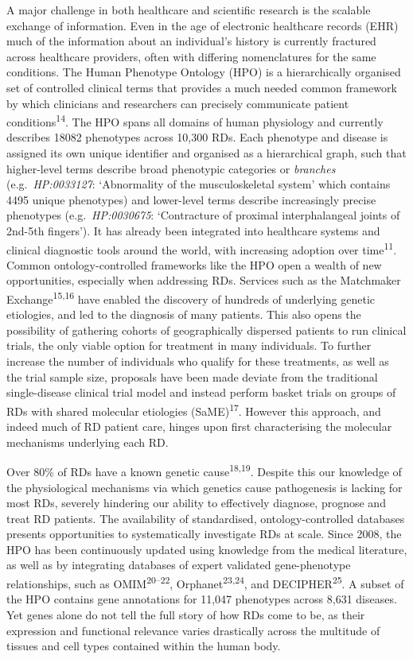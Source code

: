 \documentclass[
]{agujournal2019}
\begin{document}
A major challenge in both healthcare and scientific research is the
scalable exchange of information. Even in the age of electronic
healthcare records (EHR) much of the information about an individual's
history is currently fractured across healthcare providers, often with
differing nomenclatures for the same conditions. The Human Phenotype
Ontology (HPO) is a hierarchically organised set of controlled clinical
terms that provides a much needed common framework by which clinicians
and researchers can precisely communicate patient
conditions\textsuperscript{14}. The HPO spans all domains of human
physiology and currently describes 18082 phenotypes across 10,300 RDs.
Each phenotype and disease is assigned its own unique identifier and
organised as a hierarchical graph, such that higher-level terms describe
broad phenotypic categories or \emph{branches} (e.g.~\emph{HP:0033127}:
`Abnormality of the musculoskeletal system' which contains 4495 unique
phenotypes) and lower-level terms describe increasingly precise
phenotypes (e.g.~\emph{HP:0030675}: `Contracture of proximal
interphalangeal joints of 2nd-5th fingers'). It has already been
integrated into healthcare systems and clinical diagnostic tools around
the world, with increasing adoption over time\textsuperscript{11}.
Common ontology-controlled frameworks like the HPO open a wealth of new
opportunities, especially when addressing RDs. Services such as the
Matchmaker Exchange\textsuperscript{15,16} have enabled the discovery of
hundreds of underlying genetic etiologies, and led to the diagnosis of
many patients. This also opens the possibility of gathering cohorts of
geographically dispersed patients to run clinical trials, the only
viable option for treatment in many individuals. To further increase the
number of individuals who qualify for these treatments, as well as the
trial sample size, proposals have been made deviate from the traditional
single-disease clinical trial model and instead perform basket trials on
groups of RDs with shared molecular etiologies
(SaME)\textsuperscript{17}. However this approach, and indeed much of RD
patient care, hinges upon first characterising the molecular mechanisms
underlying each RD.

Over 80\% of RDs have a known genetic cause\textsuperscript{18,19}.
Despite this our knowledge of the physiological mechanisms via which
genetics cause pathogenesis is lacking for most RDs, severely hindering
our ability to effectively diagnose, prognose and treat RD patients. The
availability of standardised, ontology-controlled databases presents
opportunities to systematically investigate RDs at scale. Since 2008,
the HPO has been continuously updated using knowledge from the medical
literature, as well as by integrating databases of expert validated
gene-phenotype relationships, such as OMIM\textsuperscript{20--22},
Orphanet\textsuperscript{23,24}, and DECIPHER\textsuperscript{25}. A
subset of the HPO contains gene annotations for 11,047 phenotypes across
8,631 diseases. Yet genes alone do not tell the full story of how RDs
come to be, as their expression and functional relevance varies
drastically across the multitude of tissues and cell types contained
within the human body.
\end{document}

